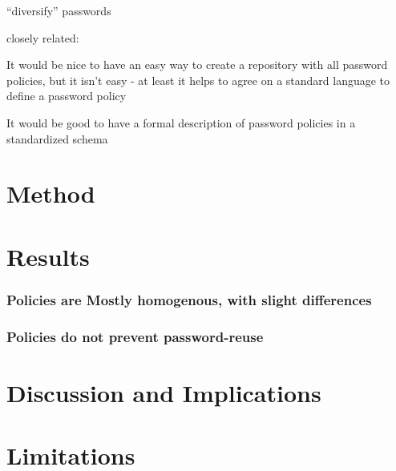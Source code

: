 \cite{Das2014TangledWeb}
\cite{Jaeger2016AnalysisOfLeaks}
\cite{Stobert2014PasswordLifeCycle}
\cite{Wash2016UnderstandingPasswordChoices}

``diversify'' passwords \cite{Segreti2017AdaptivePolicies}

\cite{Habib2017Blacklists}

closely related: \cite{Wang2015EmperorsPolicies}

	It would be nice to have an easy way to create a repository with all password policies, but it isn't easy - at least it helps to agree on a standard language to define a password policy \cite{Steves2015PasswordPolicyLanguage}

It would be good to have a formal description of password policies in a standardized schema \cite{Horsch2016PasswordPolicyMarkup}



\section{Method}

\section{Results}
\subsubsection{Policies are Mostly homogenous, with slight differences}
\subsubsection{Policies do not prevent password-reuse}

\section{Discussion and Implications}

\section{Limitations}

